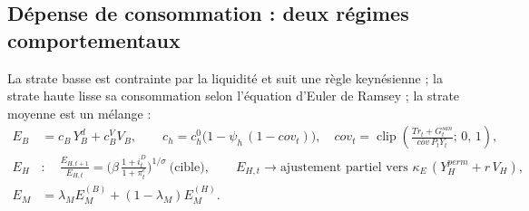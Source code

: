 \documentclass[11pt,a4paper]{article}
\newcommand{\clip}[3]{\operatorname{clip}\!\left(#1;\,#2,\,#3\right)}
\begin{document}
\subsection{Dépense de consommation : deux régimes comportementaux}
\label{sec:conso}
La strate basse est contrainte par la liquidité et suit une règle keynésienne ; la strate haute lisse sa consommation selon l'équation d'Euler de Ramsey ; la strate moyenne est un mélange :
\begin{align}
E_B &= c_B\, Y^d_B + c^V_B V_B, \qquad c_h = c^0_h\big(1 - \psi_h\,(1 - cov_t)\big), \quad cov_t = \clip{\frac{Tr_t + G^{san}_t}{\overline{cov}\,P_tY_t}}{0}{1}, \label{eq:cB}\\
E_H &: \quad \frac{E_{H,t+1}}{E_{H,t}} = \Big(\beta\,\frac{1+i^D_t}{1+\pi^e_t}\Big)^{1/\sigma} \ \text{(cible)},\qquad
E_{H,t} \to \text{ajustement partiel vers } \kappa_E\,(Y^{perm}_H + r\, V_H), \label{eq:cH}\\
E_M &= \lambda_M E_M^{(B)} + (1-\lambda_M) E_M^{(H)} . \label{eq:cM}
\end{align}
\end{document}
